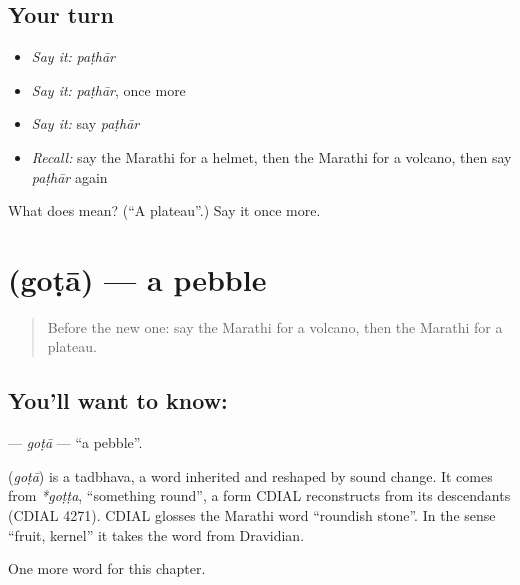 \subsection*{Your turn}
\begin{itemize}
\raggedright
  \item \emph{Say it:} \emph{paṭhār}
  \item \emph{Say it:} \emph{paṭhār}, once more
  \item \emph{Say it:} say \emph{paṭhār}
  \item \emph{Recall:} say the Marathi for a helmet, then the Marathi for a volcano, then say \emph{paṭhār} again
\end{itemize}

\begin{tcolorbox}[breakable,colback=teal!4,colframe=teal!35!black,title={Before you move on}]
What does  mean? (\textquotedblleft{}A plateau\textquotedblright{}.) Say it once more.
\end{tcolorbox}
\section[\texorpdfstring{\mr{गोटा} (goṭā)}{गोटा (goṭā)}]{ (goṭā) — a pebble}

\label{lesson:MR-C267-gota}



\begin{quote}
Before the new one: say the Marathi for a volcano, then the Marathi for a plateau.
\end{quote}

\subsection*{You'll want to know: }
\textbf{} — \emph{goṭā} — \textquotedblleft{}a pebble\textquotedblright{}.

\begin{cousinweb}
\textbf{} (\emph{goṭā}) is a tadbhava, a word inherited and reshaped by sound change. It comes from \emph{*goṭṭa}, \textquotedblleft{}something round\textquotedblright{}, a form CDIAL reconstructs from its descendants (CDIAL 4271). CDIAL glosses the Marathi word \textquotedblleft{}roundish stone\textquotedblright{}. In the sense \textquotedblleft{}fruit, kernel\textquotedblright{} it takes the word from Dravidian.
\end{cousinweb}

\begin{grammarlens}[title={What you've built}]
One more word for this chapter.
\end{grammarlens}

